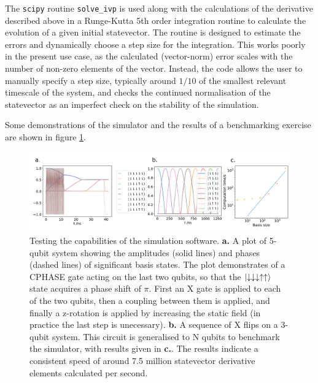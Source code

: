 \documentclass{report}
\begin{document}
The \texttt{scipy} routine \texttt{solve\_ivp} is used along with the calculations of the derivative described above in a Runge-Kutta 5th order \cite{Butcher1996} integration routine to calculate the evolution of a given initial statevector. The routine is designed to estimate the errors and dynamically choose a step size for the integration. This works poorly in the present use case, as the calculated (vector-norm) error scales with the number of non-zero elements of the vector. Instead, the code allows the user to manually specify a step size, typically around $1/10$ of the smallest relevant timescale of the system, and checks the continued normalisation of the statevector as an imperfect check on the stability of the simulation.

Some demonstrations of the simulator and the results of a benchmarking exercise are shown in figure \ref{fig:benchmark}. 
\begin{figure}[h]
    \centering
    \includegraphics[scale = 0.85]{Figures/benchmark/benchmarks.pdf}
    \caption{Testing the capabilities of the simulation software. \textbf{a.} A plot of 5-qubit system showing the amplitudes (solid lines) and phases (dashed lines) of significant basis states. The plot demonstrates of a CPHASE gate acting on the last two qubits, so that the $\ket{\downarrow\downarrow\downarrow\uparrow\uparrow}$ state acquires a phase shift of $\pi$. First an X gate is applied to each of the two qubits, then a coupling between them is applied, and finally a z-rotation is applied by increasing the static field (in practice the last step is unecessary). \textbf{b.} A sequence of X flips on a 3-qubit system. This circuit is generalised to N qubits to benchmark the simulator, with results given in \textbf{c.}. The results indicate a consistent speed of around 7.5 million statevector derivative elements calculated per second.
    \label{fig:benchmark}}
\end{figure}
\end{document}

